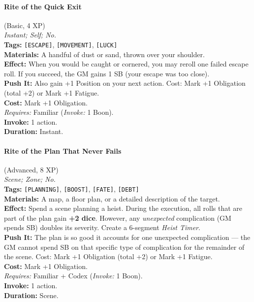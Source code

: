 \paragraph{Rite of the Quick Exit} (Basic, 4 XP) \hfill \\
\emph{Instant; Self; No.} \\
\textbf{Tags:} \texttt{[ESCAPE]}, \texttt{[MOVEMENT]}, \texttt{[LUCK]} \\
\textbf{Materials:} A handful of dust or sand, thrown over your shoulder. \\
\textbf{Effect:} When you would be caught or cornered, you may reroll one failed escape roll. If you succeed, the GM gains 1 SB (your escape was too close). \\
\textbf{Push It:} Also gain +1 Position on your next action. Cost: Mark +1 Obligation (total +2) or Mark +1 Fatigue. \\
\textbf{Cost:} Mark +1 Obligation. \\
\textit{Requires:} Familiar (\textit{Invoke:} 1 Boon). \\
\textbf{Invoke:} 1 action. \\
\textbf{Duration:} Instant.

\paragraph{Rite of the Plan That Never Fails} (Advanced, 8 XP) \hfill \\
\emph{Scene; Zone; No.} \\
\textbf{Tags:} \texttt{[PLANNING]}, \texttt{[BOOST]}, \texttt{[FATE]}, \texttt{[DEBT]} \\
\textbf{Materials:} A map, a floor plan, or a detailed description of the target. \\
\textbf{Effect:} Spend a scene planning a heist. During the execution, all rolls that are part of the plan gain \textbf{+2 dice}. However, any \textit{unexpected} complication (GM spends SB) doubles its severity. Create a 6-segment \textit{Heist Timer}. \\
\textbf{Push It:} The plan is so good it accounts for one unexpected complication --- the GM cannot spend SB on that specific type of complication for the remainder of the scene. Cost: Mark +1 Obligation (total +2) or Mark +1 Fatigue. \\
\textbf{Cost:} Mark +1 Obligation. \\
\textit{Requires:} Familiar + Codex (\textit{Invoke:} 1 Boon). \\
\textbf{Invoke:} 1 action. \\
\textbf{Duration:} Scene.

